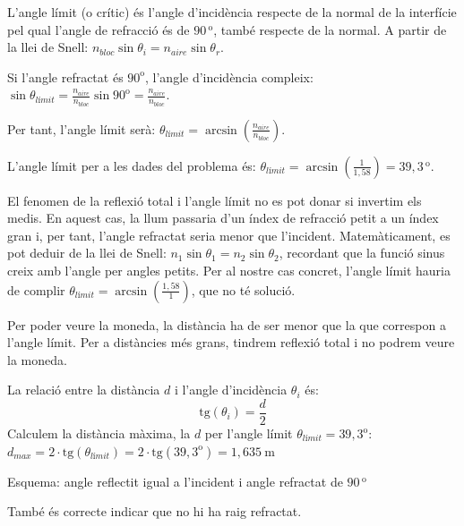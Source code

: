 \begin{solapartat}
 L'angle límit (o crític) és l'angle d'incidència respecte de la normal de la interfície pel qual l'angle de refracció és de $90\,^{\mathrm{o}}$, també respecte de la normal. A partir de la llei de Snell: $n_{bloc}\sin\theta_i = n_{aire}\sin\theta_r$.

Si l'angle refractat és $90^{\mathrm{o}}$, l'angle d'incidència compleix: $\sin\theta_{\textit{límit}} = \frac{n_{aire}}{n_{bloc}}\sin 90^{\mathrm{o}} = \frac{n_{aire}}{n_{bloc}}$.

Per tant, l'angle límit serà: $\theta_{\textit{límit}} = \arcsin\left(\frac{n_{aire}}{n_{bloc}}\right)$.

 L'angle límit per a les dades del problema és: $\theta_{\textit{límit}} = \arcsin\left(\frac{1}{1,58}\right) = 39,3\,^{\mathrm{o}}$.

 El fenomen de la reflexió total i l'angle límit no es pot donar si invertim els medis. En aquest cas, la llum passaria d'un índex de refracció petit a un índex gran i, per tant, l'angle refractat seria menor que l'incident. Matemàticament, es pot deduir de la llei de Snell: $n_1\sin\theta_1 = n_2\sin\theta_2$, recordant que la funció sinus creix amb l'angle per angles petits. Per al nostre cas concret, l'angle límit hauria de complir $\theta_{\textit{límit}} = \arcsin\left(\frac{1,58}{1}\right)$, que no té solució.
\end{solapartat}

\begin{solapartat}
 Per poder veure la moneda, la distància ha de ser menor que la que correspon a l'angle límit. Per a distàncies més grans, tindrem reflexió total i no podrem veure la moneda.

La relació entre la distància $d$ i l'angle d'incidència $\theta_i$ és:
\[ \mathrm{tg}(\theta_i) = \frac{d}{2} \]
Calculem la distància màxima, la $d$ per l'angle límit $\theta_{\textit{límit}} = 39,3^{\mathrm{o}}$: $d_{max} = 2\cdot\mathrm{tg}(\theta_{\textit{límit}}) = 2\cdot\mathrm{tg}(39,3^{\mathrm{o}}) = 1,635\ \mathrm{m}$


 Esquema: angle reflectit igual a l'incident i angle refractat de $90\,^{\mathrm{o}}$

També és correcte indicar que no hi ha raig refractat.

\end{solapartat}
